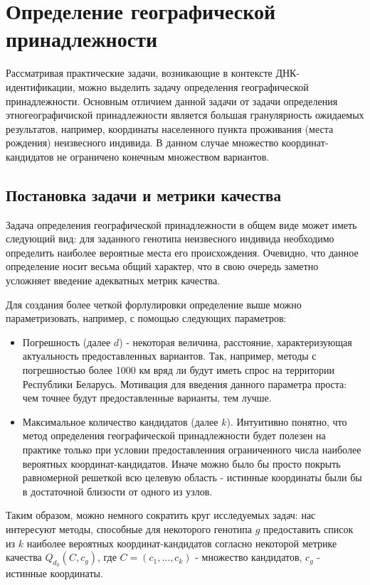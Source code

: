 \chapter{Определение географической принадлежности}

Рассматривая практические задачи, возникающие в контексте ДНК-идентификации, можно
выделить задачу определения географической принадлежности. Основным отличием данной задачи
от задачи определения этногеографичиской принадлежности является
большая гранулярность ожидаемых результатов, например, координаты населенного пункта проживания (места рождения)
неизвесного индивида. В данном случае множество координат-кандидатов не ограничено конечным множеством вариантов.

\section{Постановка задачи и метрики качества}
Задача определения географической принадлежности в общем виде может иметь следующий вид:
для заданного генотипа неизвесного индивида необходимо определить наиболее вероятные
места его происхождения. Очевидно, что данное определение носит весьма общий характер,
что в свою очередь заметно усложняет введение адекватных метрик качества.

Для создания более четкой форлулировки определение выше можно параметризовать, например,
с помощью следующих параметров:
\begin{itemize}
\item Погрешность (далее $d$) - некоторая величина, расстояние, характеризующая актуальность
предоставленных вариантов. Так, например, методы с погрешностью более 1000 км вряд ли
будут иметь спрос на территории Республики Беларусь. Мотивация для введения данного параметра проста:
чем точнее будут предоставленные варианты, тем лучше.

\item Максимальное количество кандидатов (далее $k$). Интуитивно понятно, что метод
определения географической принадлежности будет полезен на практике только при условии
предоставленния ограниченного числа наиболее вероятных координат-кандидатов. Иначе можно было бы
просто покрыть равномерной решеткой всю целевую область - истинные координаты были бы
в достаточной близости от одного из узлов.
\end{itemize}

Таким образом, можно немного сократить круг исследуемых задач:
нас интересуют методы, способные для некоторого генотипа $g$ предоставить список из $k$
наиболее вероятных координат-кандидатов согласно некоторой метрике качества $Q_{d}_{k} \left( C, c_{g} \right)$,
где $C = \left(c_{1}, ..., c_{k} \right)$ - множество кандидатов, $c_{g}$ - истинные координаты.

